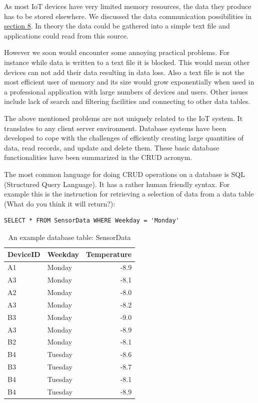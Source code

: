 \documentclass[]{book}
\theoremstyle{definition}
\theoremstyle{definition}
\theoremstyle{remark}
\begin{document}
As most IoT devices have very limited memory resources, the data they
produce has to be stored elsewhere. We discussed the data communication
possibilities in \protect\hyperlink{communication}{section 8}. In theory
the data could be gathered into a simple text file and applications
could read from this source.

However we soon would encounter some annoying practical problems. For
instance while data is written to a text file it is blocked. This would
mean other devices can not add their data resulting in data loss. Also a
text file is not the most efficient user of memory and its size would
grow exponentially when used in a professional application with large
numbers of devices and users. Other issues include lack of search and
filtering facilities and connecting to other data tables.

The above mentioned problems are not uniquely related to the IoT system.
It translates to any client server environment. Database systems have
been developed to cope with the challenges of efficiently creating large
quantities of data, read records, and update and delete them. These
basic database functionalities have been summarized in the CRUD acronym.

The most common language for doing CRUD operations on a database is SQL
(Structured Query Language). It has a rather human friendly syntax. For
example this is the instruction for retrieving a selection of data from
a data table (What do you think it will return?):

\begin{verbatim}
SELECT * FROM SensorData WHERE Weekday = 'Monday'
\end{verbatim}

\begin{table}

\caption{\label{tab:dbtable}An example database table: SensorData}
\centering
\begin{tabular}[t]{llr}
\toprule
DeviceID & Weekday & Temperature\\
\midrule
A1 & Monday & -8.9\\
A3 & Monday & -8.1\\
A2 & Monday & -8.0\\
A3 & Monday & -8.2\\
B3 & Monday & -9.0\\
\addlinespace
A3 & Monday & -8.9\\
B2 & Monday & -8.1\\
B4 & Tuesday & -8.6\\
B3 & Tuesday & -8.7\\
B4 & Tuesday & -8.1\\
B4 & Tuesday & -8.9\\
\bottomrule
\end{tabular}
\end{table}
\end{document}

